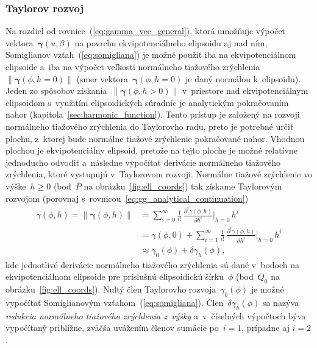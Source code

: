 \documentclass[a4paper, 12pt]{book}
\begin{document}
\subsubsection{Taylorov rozvoj}
\label{sec:normal_gravity_taylor_expansion}

Na rozdiel od rovnice~(\ref{eq:gamma_vec_general}), ktorá umožňuje výpočet 
vektora~$\boldsymbol \gamma(u, \beta)$ na povrchu ekvipotenciálneho elipsoidu 
aj nad ním, Somiglianov vzťah~(\ref{eq:somigliana}) je možné použiť iba na 
ekvipotenciálnom elipsoide a~iba na výpočet veľkosti normálneho tiažového 
zrýchlenia~$\| \boldsymbol \gamma(\phi, h = 0) \|$ (smer vektora~$\boldsymbol 
\gamma(\phi, h = 0)$ je daný normálou k~elipsoidu).  Jeden zo spôsobov 
získania~$\| \boldsymbol \gamma(\phi, h > 0) \|$ v~priestore nad 
ekvipotenciálnym elipsoidom s~využitím elipsoidických súradníc je analytickým 
pokračovaním nahor (kapitola~\ref{sec:harmonic_function}).  Tento prístup je 
založený na rozvoji normálneho tiažového zrýchlenia do Taylorovho radu, preto 
je potrebné určiť plochu, z~ktorej bude normálne tiažové zrýchlenie pokračované 
nahor.  Vhodnou plochou je ekvipotenciálny elipsoid, pretože na tejto ploche je 
možné relatívne jednoducho odvodiť a~následne vypočítať derivácie normálneho 
tiažového zrýchlenia, ktoré vystupujú v~Taylorovom rozvoji.  Normálne tiažové 
zrýchlenie vo výške~$h \geq 0$ (bod~$P$ na obrázku~\ref{fig:ell_coords}) tak 
získame Taylorovým rozvojom (porovnaj 
s~rovnicou~\ref{eq:gg_analytical_continuation})
%
\begin{equation}
\label{eq:gamma_taylor}
\begin{split}
\gamma(\phi, h) = \| \boldsymbol \gamma(\phi, h) \| &= \sum_{i = 0}^{\infty} 
\frac{1}{i!} \, \frac{\partial^i \gamma(\phi, h)}{\partial h^i} \bigg\lvert_{h 
= 0} \, h^i\\
%
&= \gamma(\phi, 0) + \sum_{i = 1}^{\infty} \frac{1}{i!} \, \frac{\partial^i 
\gamma(\phi, h)}{\partial h^i} \bigg\lvert_{h = 0} \, h^i\\
%
&\approx \gamma_0(\phi) + \delta\gamma_h(\phi){,}
\end{split}
\end{equation}
%
kde jednotlivé derivácie normálneho tiažového zrýchlenia sú dané v~bodoch na 
ekvipotenciálnom elipsoide pre príslušnú elipsoidickú šírku~$\phi$ (bod~$Q_0$ 
na obrázku~\ref{fig:ell_coords}).  Nultý člen Taylorovho 
rozvoja~$\gamma_0(\phi)$ je možné vypočítať Somiglianovým 
vzťahom~(\ref{eq:somigliana}).  Člen~$\delta\gamma_h(\phi)$ sa nazýva 
\emph{redukcia normálneho tiažového zrýchlenia z~výšky} a~v~číselných výpočtoch 
býva vypočítaný približne, zväčša uvážením členov sumácie po~$i = 1$, prípadne 
aj $i = 2$.
\end{document}
